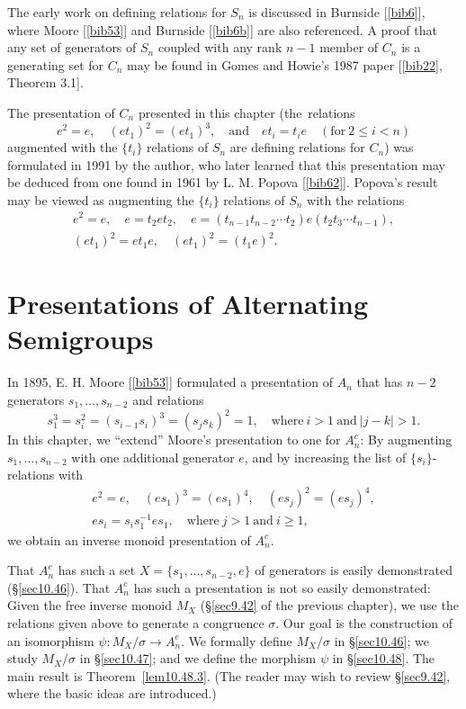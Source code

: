 \documentclass{surv-l}
\numberwithin{equation}{section}
\numberwithin{table}{section}
\numberwithin{figure}{section}
\theoremstyle{plain}
\theoremstyle{definition}
\begin{document}
The early work on defining relations for $S_{n}$ is discussed in
Burnside [\ref{bib6}], where Moore [\ref{bib53}] and Burnside
[\ref{bib6b}] are also referenced. A proof that
any set of generators of $S_{n}$ coupled with any rank $n-1$
member of $C_{n}$ is a generating set for $C_{n}$ may be found in
Gomes and Howie's 1987 paper [\ref{bib22},  Theorem 3.1].

The presentation of $C_{n}$ presented in this chapter
(the~relations
\[
e^{2}=e,\quad (et_{1})^{2}=(et_{1})^{3},\quad \mathrm{and}\quad et_{i}
=t_{i}e\quad (\mathrm{for}\ 2\leq i<n)
\]
augmented with the $\{t_{i}\}$ relations of $S_{n}$ are defining
relations for $C_{n}$) was formulated in 1991 by the author, who
later learned that this presentation may be deduced from one found
in 1961 by L. M. Popova
[\ref{bib62}]. Popova's result may be viewed as
augmenting the $\{t_{i}\}$ relations of $S_{n}$ with the relations
\begin{gather*}
e^{2}=e,\quad e=t_{2}et_{2},\quad e=(t_{n-1}t_{n-2}\cdots t_{2})e(t_{2}t_{3}\cdots t_{n-1}), \\
(et_{1})^{2}=et_{1}e,\quad (et_{1})^{2}=(t_{1}e)^{2}.
\end{gather*}

\chapter{Presentations of Alternating Semigroups}\label{chap10}

In 1895, E. H. Moore
[\ref{bib53}] formulated a presentation of
$A_{n}$ that has $n-2$ generators $s_{1},\ldots, s_{n-2}$ and
relations
\[
s_{1}^{3}=s_{i}^{2}=(s_{i-1}s_{i})^{3}=(s_{j}s_{k})^{2}=1,\quad \mathrm{where}\ i>1\ \mathrm{and}\ |j-k|>1.
\]
In this chapter, we ``extend'' Moore's presentation to one for
$A_{n}^{c}$: By augmenting $s_{1},\ldots,s_{n-2}$ with one
additional generator $e$, and by increasing the list of
$\{s_{i}\}$-relations with
\begin{gather*}
e^{2}=e,\quad (es_{1})^{3}=(es_{1})^{4},\quad (es_{j})^{2}=(es_{j})^{4}, \\
es_{i}=s_{i}s_{1}^{-1}es_{1},\quad \mathrm{where}\ j>1\ \mathrm{and}\ i\geq 1,
\end{gather*}
we obtain an inverse monoid presentation of $A_{n}^{c}$.

That $A_{n}^{c}$ has such a set $X =\{s_{1},\ldots, s_{n-2}, e\}$
of generators is easily demonstrated (\S\ref{sec10.46}). That
$A_{n}^{c}$ has such a presentation is not so easily demonstrated:
Given the free inverse monoid $M_{X}$ (\S\ref{sec9.42} of the
previous chapter), we use the relations given above to generate a
congruence $\sigma$. Our goal is the construction of an
isomorphism $\psi : M_{X}/\sigma\rightarrow A_{n}^{c}$. We
formally define $M_{X}/\sigma$ in \S\ref{sec10.46}; we study
$M_{X}/\sigma$ in \S\ref{sec10.47}; and we define the morphism
$\psi$ in \S\ref{sec10.48}. The main result is
Theorem~\ref{lem10.48.3}. (The reader may wish to review
\S\ref{sec9.42}, where the basic ideas are introduced.)
\end{document}
